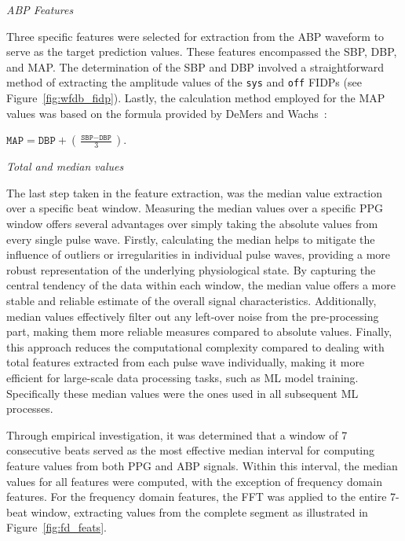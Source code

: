 \newpage
\textit{ABP Features}
\vspace{0.2cm}

Three specific features were selected for extraction from the ABP waveform to serve as the target prediction values.
These features encompassed the SBP, DBP, and MAP\@.
The determination of the SBP and DBP involved a straightforward method of extracting the amplitude values of the \texttt{sys} and \texttt{off} FIDPs (see Figure~\ref{fig:wfdb_fidp}).
Lastly, the calculation method employed for the MAP values was based on the formula provided by DeMers and Wachs~\cite{demersPhysiologyMeanArterial2024}:

\vspace{-0.5cm}
\large
\begin{center}
    \begin{math}
        \texttt{MAP} = \texttt{DBP} + \left(\frac{\texttt{SBP} - \texttt{DBP}}{3}\right).
    \end{math}
\end{center}
\normalsize

\textit{Total and median values}
\vspace{0.2cm}

The last step taken in the feature extraction, was the median value extraction over a specific beat window.
Measuring the median values over a specific PPG window offers several advantages over simply taking the absolute values from every single pulse wave.
Firstly, calculating the median helps to mitigate the influence of outliers or irregularities in individual pulse waves, providing a more robust representation of the underlying physiological state.
By capturing the central tendency of the data within each window, the median value offers a more stable and reliable estimate of the overall signal characteristics.
Additionally, median values effectively filter out any left-over noise from the pre-processing part, making them more reliable measures compared to absolute values.
Finally, this approach reduces the computational complexity compared to dealing with total features extracted from each pulse wave individually, making it more efficient for large-scale data processing tasks, such as ML model training.
Specifically these median values were the ones used in all subsequent ML processes.

Through empirical investigation, it was determined that a window of 7 consecutive beats served as the most effective median interval
for computing feature values from both PPG and ABP signals.
Within this interval, the median values for all features were computed, with the exception of frequency domain features.
For the frequency domain features, the FFT was applied to the entire 7-beat window, extracting values from the complete segment as illustrated in Figure~\ref{fig:fd_feats}.

